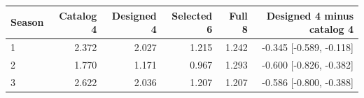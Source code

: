 \begin{tabular}{lrrrrr}
\toprule
Season & Catalog 4 & Designed 4 & Selected 6 & Full 8 & Designed 4 minus catalog 4 \\
\midrule
1 & 2.372 & 2.027 & 1.215 & 1.242 & -0.345 [-0.589, -0.118] \\
2 & 1.770 & 1.171 & 0.967 & 1.293 & -0.600 [-0.826, -0.382] \\
3 & 2.622 & 2.036 & 1.207 & 1.207 & -0.586 [-0.800, -0.388] \\
\bottomrule
\end{tabular}
